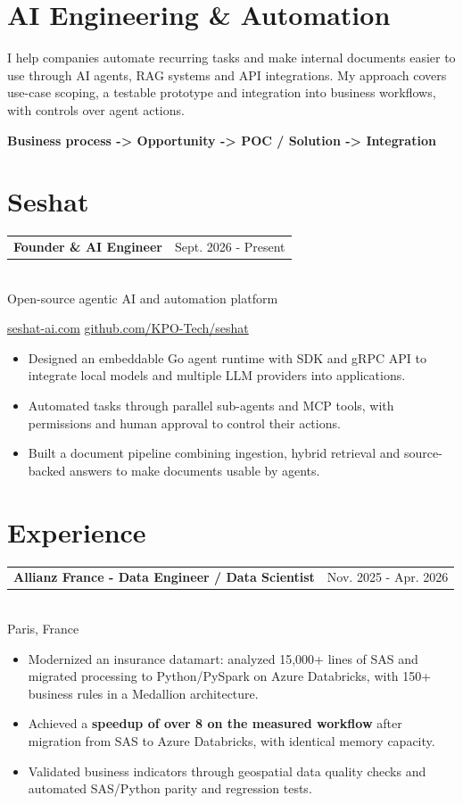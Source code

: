 \documentclass[10pt,a4paper]{article}
\makeatletter
\newcommand{\role}[3]{%
  \vspace{2.2pt}
  \begin{tabularx}{\linewidth}{@{}Xr@{}}
  \textbf{#1} & {\color{muted}#2}
  \end{tabularx}\vspace{0.8pt}\\
  {\color{muted}#3}\par
  \vspace{2pt}
}
\makeatother
\begin{document}
\begin{lrbox}{\maincolumnbox}
\begin{minipage}[t]{0.695\textwidth}
\vspace{0pt}
\raggedright

\section{AI Engineering \& Automation}
I help companies automate recurring tasks and make internal documents easier to use through AI agents, RAG systems and API integrations. My approach covers use-case scoping, a testable prototype and integration into business workflows, with controls over agent actions.

\textbf{\color{accent}Business process -> Opportunity -> POC / Solution -> Integration}

\vspace{7pt}
\section{Seshat}
\role{Founder \& AI Engineer}{Sept. 2026 - Present}{Open-source agentic AI and automation platform}
{\footnotesize \href{https://seshat-ai.com}{seshat-ai.com} \textbullet{} \href{https://github.com/KPO-Tech/seshat}{github.com/KPO-Tech/seshat}}\par
\begin{itemize}
  \item Designed an embeddable Go agent runtime with SDK and gRPC API to integrate local models and multiple LLM providers into applications.
  \item Automated tasks through parallel sub-agents and MCP tools, with permissions and human approval to control their actions.
  \item Built a document pipeline combining ingestion, hybrid retrieval and source-backed answers to make documents usable by agents.
\end{itemize}

\section{Experience}
\role{Allianz France - Data Engineer / Data Scientist}{Nov. 2025 - Apr. 2026}{Paris, France}
\begin{itemize}
  \item Modernized an insurance datamart: analyzed 15,000+ lines of SAS and migrated processing to Python/PySpark on Azure Databricks, with 150+ business rules in a Medallion architecture.
  \item Achieved a \textbf{speedup of over 8\texttimes{} on the measured workflow} after migration from SAS to Azure Databricks, with identical memory capacity.
  \item Validated business indicators through geospatial data quality checks and automated SAS/Python parity and regression tests.
\end{itemize}


\end{minipage}
\end{lrbox}
\end{document}
